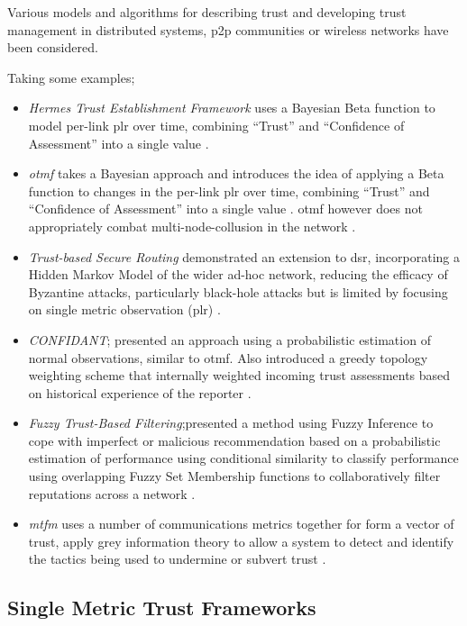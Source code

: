 Various models and algorithms for describing trust and developing trust management in distributed systems, \gls{p2p} communities or wireless networks have been considered.

Taking some examples;
%
\begin{itemize}
  \item \emph{Hermes Trust Establishment Framework} uses a Bayesian Beta function to model per-link \gls{plr} over time, combining ``Trust'' and ``Confidence of Assessment'' into a single value \cite{Zouridaki2005}.
  \item \emph{\acrfull{otmf}} takes a Bayesian approach and introduces the idea of applying a Beta function to changes in the per-link \gls{plr} over time, combining ``Trust'' and ``Confidence of Assessment'' into a single value \cite{Li2008}.
    \gls{otmf} however does not appropriately combat multi-node-collusion in the network \cite{Cho2011}.
  \item \emph{Trust-based Secure Routing} demonstrated an extension to \gls{dsr}, incorporating a Hidden Markov Model of the wider ad-hoc network, reducing the efficacy of Byzantine attacks, particularly black-hole attacks but is limited by focusing on single metric observation (\gls{plr}) \cite{Moe2008a,Cho2011}.
  \item \emph{CONFIDANT}; presented an approach using a probabilistic estimation of normal observations, similar to \gls{otmf}.
    Also introduced a greedy topology weighting scheme that internally weighted incoming trust assessments based on historical experience of the reporter \cite{Buchegger2002}.
  \item \emph{Fuzzy Trust-Based Filtering};presented a method using Fuzzy Inference to cope with imperfect or malicious recommendation based on a probabilistic estimation of performance using conditional similarity to classify performance using overlapping Fuzzy Set Membership functions to collaboratively filter reputations across a network \cite{Luo2008}.
  \item \emph{\acrfull{mtfm}} uses a number of communications metrics together for form a vector of trust, apply grey information theory to allow a system to detect and identify the tactics being used to undermine or subvert trust \cite{Guo11}.
\end{itemize}
%

\subsection{Single Metric Trust Frameworks}

